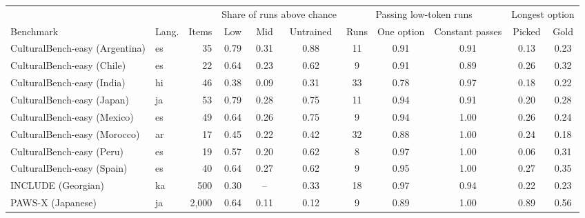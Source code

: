 \begin{tabular}{llrcccccccc}
\toprule
 & & & \multicolumn{3}{c}{Share of runs above chance} & \multicolumn{3}{c}{Passing low-token runs} & \multicolumn{2}{c}{Longest option} \\
\cmidrule(lr){4-6}\cmidrule(lr){7-9}\cmidrule(lr){10-11}
Benchmark & Lang. & Items & Low & Mid & Untrained & Runs & One option & Constant passes & Picked & Gold \\
\midrule
CulturalBench-easy (Argentina) & es & 35 & 0.79 & 0.31 & 0.88 & 11 & 0.91 & 0.91 & 0.13 & 0.23 \\
CulturalBench-easy (Chile) & es & 22 & 0.64 & 0.23 & 0.62 & 9 & 0.91 & 0.89 & 0.26 & 0.32 \\
CulturalBench-easy (India) & hi & 46 & 0.38 & 0.09 & 0.31 & 33 & 0.78 & 0.97 & 0.18 & 0.22 \\
CulturalBench-easy (Japan) & ja & 53 & 0.79 & 0.28 & 0.75 & 11 & 0.94 & 0.91 & 0.20 & 0.28 \\
CulturalBench-easy (Mexico) & es & 49 & 0.64 & 0.26 & 0.75 & 9 & 0.94 & 1.00 & 0.26 & 0.24 \\
CulturalBench-easy (Morocco) & ar & 17 & 0.45 & 0.22 & 0.42 & 32 & 0.88 & 1.00 & 0.24 & 0.18 \\
CulturalBench-easy (Peru) & es & 19 & 0.57 & 0.20 & 0.62 & 8 & 0.97 & 1.00 & 0.06 & 0.31 \\
CulturalBench-easy (Spain) & es & 40 & 0.64 & 0.27 & 0.62 & 9 & 0.95 & 1.00 & 0.27 & 0.35 \\
INCLUDE (Georgian) & ka & 500 & 0.30 & -- & 0.33 & 18 & 0.97 & 0.94 & 0.22 & 0.23 \\
PAWS-X (Japanese) & ja & 2{,}000 & 0.64 & 0.11 & 0.12 & 9 & 0.89 & 1.00 & 0.89 & 0.56 \\
\bottomrule
\end{tabular}
